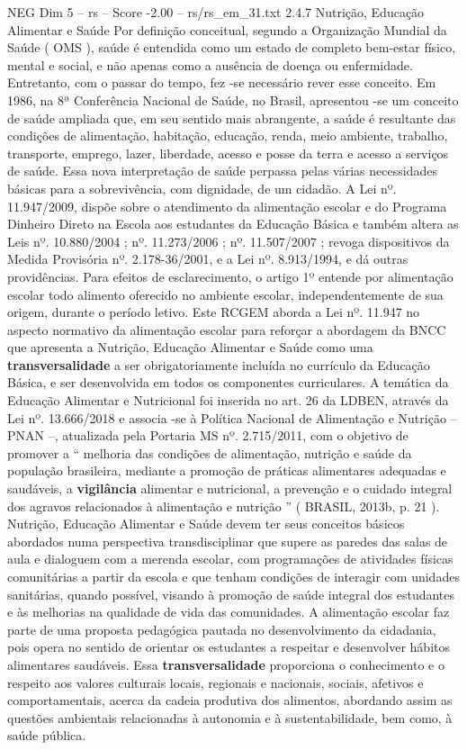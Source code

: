 \begin{textsample}{NEG Dim 5 – rs – Score -2.00 – rs/rs\_em\_31.txt}  \label{ex:f5_neg_022}
2.4.7 Nutrição, Educação Alimentar e Saúde Por definição conceitual, segundo a Organização Mundial da Saúde ( OMS ), saúde é entendida como um estado de completo bem-estar físico, mental e social, e não apenas como a ausência de doença ou enfermidade.
Entretanto, com o passar do tempo, fez -se necessário rever esse conceito.
Em 1986, na 8ª Conferência Nacional de Saúde, no Brasil, apresentou -se um conceito de saúde ampliada que, em seu sentido mais abrangente, a saúde é resultante das condições de alimentação, habitação, educação, renda, meio ambiente, trabalho, transporte, emprego, lazer, liberdade, acesso e posse da terra e acesso a serviços de saúde.
Essa nova interpretação de saúde perpassa pelas várias necessidades básicas para a sobrevivência, com dignidade, de um cidadão.
A Lei nº. 11.947/2009, dispõe sobre o atendimento da alimentação escolar e do Programa Dinheiro Direto na Escola aos estudantes da Educação Básica e também altera as Leis nº. 10.880/2004 ; nº. 11.273/2006 ; nº. 11.507/2007 ; revoga dispositivos da Medida Provisória nº. 2.178-36/2001, e a Lei nº. 8.913/1994, e dá outras providências.
Para efeitos de esclarecimento, o artigo 1º entende por alimentação escolar todo alimento oferecido no ambiente escolar, independentemente de sua origem, durante o período letivo.
Este RCGEM aborda a Lei nº. 11.947 no aspecto normativo da alimentação escolar para reforçar a abordagem da BNCC que apresenta a Nutrição, Educação Alimentar e Saúde como uma \textbf{transversalidade} a ser obrigatoriamente incluída no currículo da Educação Básica, e ser desenvolvida em todos os componentes curriculares.
A temática da Educação Alimentar e Nutricional foi inserida no art. 26 da LDBEN, através da Lei nº. 13.666/2018 e associa -se à Política Nacional de Alimentação e Nutrição – PNAN –, atualizada pela Portaria MS nº. 2.715/2011, com o objetivo de promover a “ melhoria das condições de alimentação, nutrição e saúde da população brasileira, mediante a promoção de práticas alimentares adequadas e saudáveis, a \textbf{vigilância} alimentar e nutricional, a prevenção e o cuidado integral dos agravos relacionados à alimentação e nutrição ” ( BRASIL, 2013b, p. 21 ).
Nutrição, Educação Alimentar e Saúde devem ter seus conceitos básicos abordados numa perspectiva transdisciplinar que supere as paredes das salas de aula e dialoguem com a merenda escolar, com programações de atividades físicas comunitárias a partir da escola e que tenham condições de interagir com unidades sanitárias, quando possível, visando à promoção de saúde integral dos estudantes e às melhorias na qualidade de vida das comunidades.
A alimentação escolar faz parte de uma proposta pedagógica pautada no desenvolvimento da cidadania, pois opera no sentido de orientar os estudantes a respeitar e desenvolver hábitos alimentares saudáveis.
Essa \textbf{transversalidade} proporciona o conhecimento e o respeito aos valores culturais locais, regionais e nacionais, sociais, afetivos e comportamentais, acerca da cadeia produtiva dos alimentos, abordando assim as questões ambientais relacionadas à autonomia e à sustentabilidade, bem como, à saúde pública.

\end{textsample}
